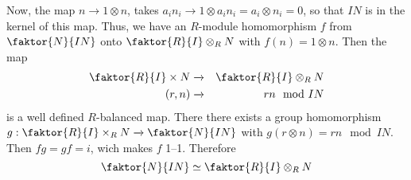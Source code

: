 \begin{example}
\begin{enumerate}
            Now, the map $n \xrightarrow{} 1 \otimes n$, takes $a_in_i
            \xrightarrow{} 1 \otimes a_in_i=a_i \otimes n_i=0$, so that $IN$ is
            in the kernel of this map. Thus, we have an  $R$-module homomorphism
             $f$ from  $\faktor{N}{IN}$ onto $\faktor{R}{I} \otimes_R N$ with
             $f(n)=1 \otimes n$. Then the map
             \begin{eqnarray*}
                 \faktor{R}{I} \times N & \xrightarrow{} & \faktor{R}{I}
                                             \otimes_R N    \\
                 (r,n)  & \xrightarrow{} &  rn \mod{IN} \\
             \end{eqnarray*}
             is a well defined $R$-balanced map. There there exists a group
             homomorphism $g:\faktor{R}{I} \times_R N \xrightarrow{}
             \faktor{N}{IN}$ with $g(r \otimes n)=rn \mod{IN}$. Then $fg=gf=i$,
             wich makes  $f$ 1--1. Therefore
             \begin{equation*}
                 \faktor{N}{IN} \simeq \faktor{R}{I} \otimes_R N
             \end{equation*}
    \end{enumerate}
\end{example}

